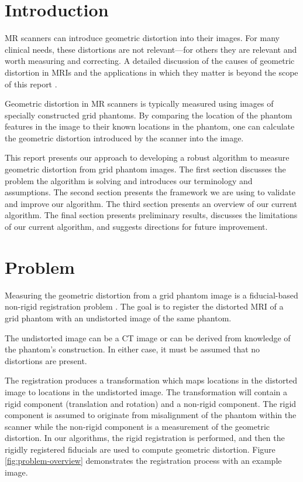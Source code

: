 \documentclass[12pt]{article}
\begin{document}
\maketitle

\section{Introduction}
MR scanners can introduce geometric distortion into their images.  For many clinical needs, these distortions are not relevant---for others they are relevant and worth measuring and correcting.  A detailed discussion of the causes of geometric distortion in MRIs and the applications in which they matter is beyond the scope of this report \cite{baldwin2007,torfeh2015,wang2005,mribook}.  

Geometric distortion in MR scanners is typically measured using images of specially constructed grid phantoms. By comparing the location of the phantom features in the image to their known locations in the phantom, one can calculate the geometric distortion introduced by the scanner into the image.

This report presents our approach to developing a robust algorithm to measure geometric distortion from grid phantom images. The first section discusses the problem the algorithm is solving and introduces our terminology and assumptions.  The second section presents the framework we are using to validate and improve our algorithm.  The third section presents an overview of our current algorithm.  The final section presents preliminary results, discusses the limitations of our current algorithm, and suggests directions for future improvement.

\section{Problem}
Measuring the geometric distortion from a grid phantom image is a fiducial-based non-rigid registration problem \cite{hill2001}.  The goal is to register the distorted MRI of a grid phantom with an undistorted image of the same phantom.

The undistorted image can be a CT image or can be derived from knowledge of the phantom's construction. In either case, it must be assumed that no distortions are present.

The registration produces a transformation which maps locations in the distorted image to locations in the undistorted image.  The transformation will contain a rigid component (translation and rotation) and a non-rigid component.  The rigid component is assumed to originate from misalignment of the phantom within the scanner while the non-rigid component is a measurement of the geometric distortion.  In our algorithms, the rigid registration is performed, and then the rigidly registered fiducials are used to compute geometric distortion.  Figure \ref{fig:problem-overview} demonstrates the registration process with an example image.
\end{document}
